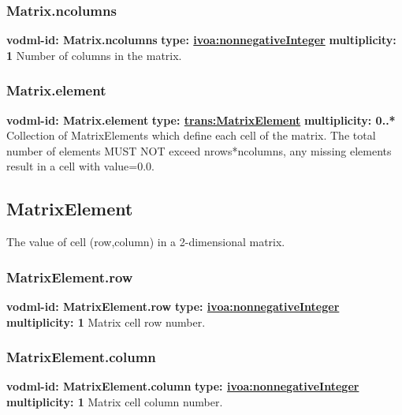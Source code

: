     \subsubsection{Matrix.ncolumns}
      \textbf{vodml-id: Matrix.ncolumns} \newline
      \textbf{type: \hyperref[sect:ivoa]{ivoa:nonnegativeInteger}} \newline
      \textbf{multiplicity: 1} \newline 
      Number of columns in the matrix.

    \subsubsection{Matrix.element}
      \textbf{vodml-id: Matrix.element} \newline
      \textbf{type: \hyperref[sect:MatrixElement]{trans:MatrixElement}} \newline
      \textbf{multiplicity: 0..*} \newline 
      Collection of MatrixElements which define each cell of the matrix. The total number of elements MUST NOT exceed nrows*ncolumns, any missing elements result in a cell with value=0.0.

  \subsection{MatrixElement}
  \label{sect:MatrixElement}
    The value of cell (row,column) in a 2-dimensional matrix.

    \subsubsection{MatrixElement.row}
      \textbf{vodml-id: MatrixElement.row} \newline
      \textbf{type: \hyperref[sect:ivoa]{ivoa:nonnegativeInteger}} \newline
      \textbf{multiplicity: 1} \newline 
      Matrix cell row number.

    \subsubsection{MatrixElement.column}
      \textbf{vodml-id: MatrixElement.column} \newline
      \textbf{type: \hyperref[sect:ivoa]{ivoa:nonnegativeInteger}} \newline
      \textbf{multiplicity: 1} \newline 
      Matrix cell column number.

